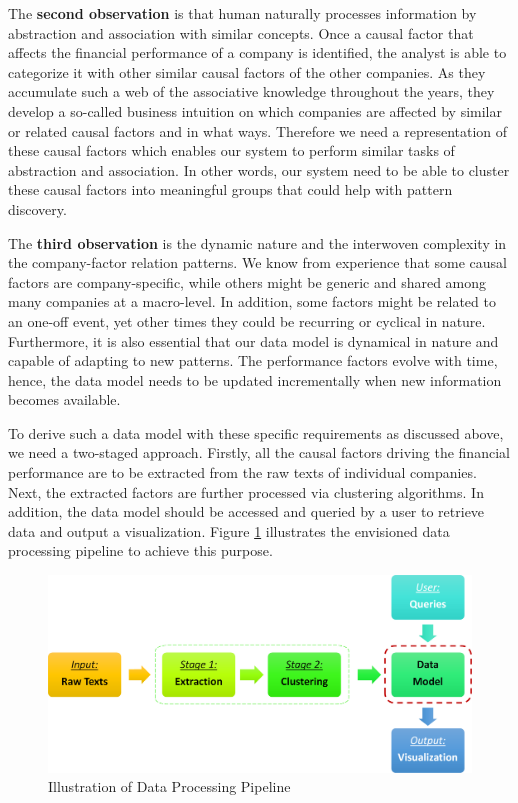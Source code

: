 The \textbf{second observation} is that human naturally processes information by abstraction and association with similar concepts. Once a causal factor that affects the financial performance of a company is identified, the analyst is able to categorize it with other similar causal factors of the other companies. As they accumulate such a web of the associative knowledge throughout the years, they develop a so-called business intuition on which companies are affected by similar or related causal factors and in what ways. Therefore we need a representation of these causal factors which enables our system to perform similar tasks of abstraction and association. In other words, our system need to be able to cluster these causal factors into meaningful groups that could help with pattern discovery.

The \textbf{third observation} is the dynamic nature and the interwoven complexity in the company-factor relation patterns. We know from experience that some causal factors are company-specific, while others might be generic and shared among many companies at a macro-level. In addition, some factors might be related to an one-off event, yet other times they could be recurring or cyclical in nature. Furthermore, it is also essential that our data model is dynamical in nature and capable of adapting to new patterns. The performance factors evolve with time, hence, the data model needs to be updated incrementally when new information becomes available.
  
To derive such a data model with these specific requirements as discussed above, we need a two-staged approach. Firstly, all the causal factors driving the financial performance are to be extracted from the raw texts of individual companies. Next, the extracted factors are further processed via clustering algorithms. In addition, the data model should be accessed and queried by a user to retrieve data and output a visualization. Figure \ref{fig:pipeline} illustrates the envisioned data processing pipeline to achieve this purpose.  

\begin{figure}[h!]
\centering
  \includegraphics[scale=1.4]{figures/Pipeline_0.png}
  \caption{Illustration of Data Processing Pipeline}
  \label{fig:pipeline}
\end{figure}



